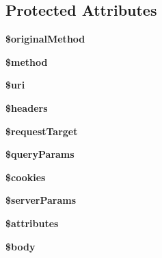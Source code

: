 \subsection*{Protected Attributes}
\begin{DoxyCompactItemize}
\item 
\mbox{\label{class_pes_1_1_http_1_1_request_a0cf8e361952ccfd37629d55ed28f75d2}} 
{\bfseries \$original\+Method}
\item 
\mbox{\label{class_pes_1_1_http_1_1_request_a12661b2fc0f57f97e30a1620889ce9c6}} 
{\bfseries \$method}
\item 
\mbox{\label{class_pes_1_1_http_1_1_request_a653b5458163d338546c47271b4fb81b7}} 
{\bfseries \$uri}
\item 
\mbox{\label{class_pes_1_1_http_1_1_request_a52500036ee807241b8b4b7e2367c49ef}} 
{\bfseries \$headers}
\item 
\mbox{\label{class_pes_1_1_http_1_1_request_a65b242932f93e360399f74d03ed4783e}} 
{\bfseries \$request\+Target}
\item 
\mbox{\label{class_pes_1_1_http_1_1_request_a1027826079dfee260e56bc2b07a31d4e}} 
{\bfseries \$query\+Params}
\item 
\mbox{\label{class_pes_1_1_http_1_1_request_aef9f7eafd54f6e36423347bed723c67e}} 
{\bfseries \$cookies}
\item 
\mbox{\label{class_pes_1_1_http_1_1_request_a692c293d73070bda1a5b900a3b3ab878}} 
{\bfseries \$server\+Params}
\item 
\mbox{\label{class_pes_1_1_http_1_1_request_adc851f7a62250e75df0490c0280aef4c}} 
{\bfseries \$attributes}
\item 
\mbox{\label{class_pes_1_1_http_1_1_request_a26b9f9373f7bb79dfcf8a86dff086b45}} 
{\bfseries \$body}
\item 

\end{DoxyCompactItemize}

